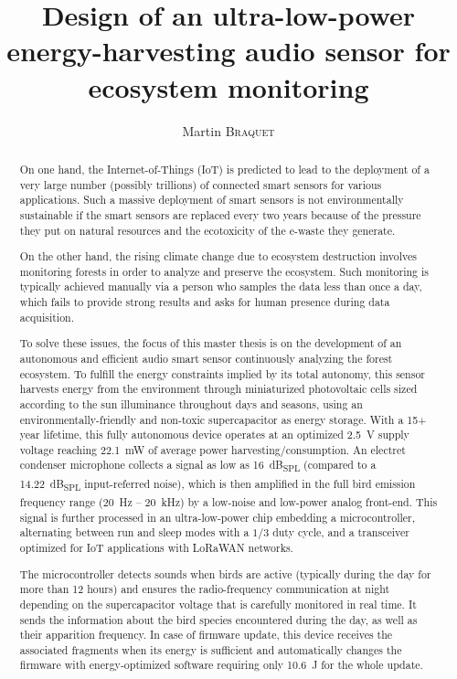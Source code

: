 \documentclass{EPL-master-thesis-covers-EN}
\title{Design of an ultra-low-power energy-harvesting audio sensor for ecosystem monitoring}
\author{Martin \textsc{Braquet}\!\nnfootnote{\url{martin.braquet@hotmail.com}}}
\begin{document}
\hypersetup{pageanchor=false}

\maketitle

\begin{abstract}

On one hand, the Internet-of-Things (IoT) is predicted to lead to the deployment of a very large number (possibly trillions) of connected smart sensors for various applications. Such a massive deployment of smart sensors is not environmentally sustainable if the smart sensors are replaced every two years because of the pressure they put on natural resources and the ecotoxicity of the e-waste they generate.

On the other hand, the rising climate change due to ecosystem destruction involves monitoring forests in order to analyze and preserve the ecosystem. Such monitoring is typically achieved manually via a person who samples the data less than once a day, which fails to provide strong results and asks for human presence during data acquisition.

To solve these issues, the focus of this master thesis is on the development of an autonomous and efficient audio smart sensor continuously analyzing the forest ecosystem. To fulfill the energy constraints implied by its total autonomy, this sensor harvests energy from the environment through miniaturized photovoltaic cells sized according to the sun illuminance throughout days and seasons, using an environmentally-friendly and non-toxic supercapacitor as energy storage.
With a 15+ year lifetime, this fully autonomous device operates at an optimized \SI{2.5}{V} supply voltage reaching \SI{22.1}{mW} of average power harvesting/consumption. An electret condenser microphone collects a signal as low as \SI{16}{dB_{SPL}} (compared to a \SI{14.22}{dB_{SPL}} input-referred noise), which is then amplified in the full bird emission frequency range (\SI{20}{Hz} -- \SI{20}{kHz}) by a low-noise and low-power analog front-end. This signal is further processed in an ultra-low-power chip embedding a microcontroller, alternating between run and sleep modes with a $1/3$ duty cycle, and a transceiver optimized for IoT applications with LoRaWAN networks. 

The microcontroller detects sounds when birds are active (typically during the day for more than 12 hours) and ensures the radio-frequency communication at night depending on the supercapacitor voltage that is carefully monitored in real time. It sends the information about the bird species encountered during the day, as well as their apparition frequency. In case of firmware update, this device receives the associated fragments when its energy is sufficient and automatically changes the firmware with energy-optimized software requiring only \SI{10.6}{J} for the whole update.


\end{abstract}
\end{document}
